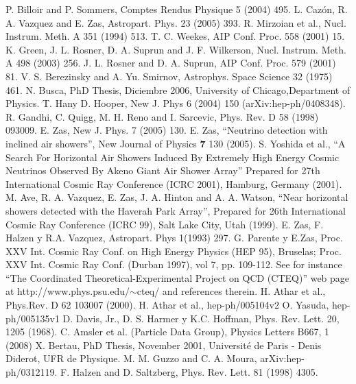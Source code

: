 \begin{thebibliography}{1}
 P. Billoir and P. Sommers, Comptes Rendus Physique 5 (2004) 495.
 L. Cazón, R. A. Vazquez and E. Zas, Astropart. Phys. 23 (2005) 393.
 R. Mirzoian et al., Nucl. Instrum. Meth. A 351 (1994) 513.
 T. C. Weekes, AIP Conf. Proc. 558 (2001) 15.
 K. Green, J. L. Rosner, D. A. Suprun and J. F. Wilkerson, Nucl. Instrum. Meth. A 498 (2003) 256.
 J. L. Rosner and D. A. Suprun, AIP Conf. Proc. 579 (2001) 81.
 V. S. Berezinsky and A. Yu. Smirnov, Astrophys. Space Science 32 (1975) 461.
 N. Busca, PhD Thesis, Diciembre 2006, University of Chicago,Department of Physics.
 T. Hany D. Hooper, New J. Phys 6 (2004) 150 (arXiv:hep-ph/0408348).
 R. Gandhi, C. Quigg, M. H. Reno and I. Sarcevic, Phys. Rev. D 58 (1998) 093009.
 E. Zas, New J. Phys. 7 (2005) 130.
 E. Zas, ``Neutrino detection with inclined air showers'', New Journal of Physics {\bf 7} 130 (2005).
 S. Yoshida et al., ``A Search For Horizontal Air Showers Induced By Extremely High Energy Cosmic Neutrinos Observed By Akeno Giant Air Shower Array'' Prepared for 27th International Cosmic Ray Conference (ICRC 2001), Hamburg, Germany (2001).
 M. Ave, R. A. Vazquez, E. Zas, J. A. Hinton and A. A. Watson, ``Near horizontal showers detected with the Haverah Park Array'', Prepared for 26th International Cosmic Ray Conference (ICRC 99), Salt Lake City, Utah (1999).    
 E. Zas, F. Halzen y R.A. Vazquez, Astropart. Phys 1(1993) 297.
 G. Parente y E.Zas, Proc. XXV Int. Cosmic Ray Conf. on High Energy Physics (HEP 95), Bruselas; Proc. XXV Int. Cosmic Ray Conf. (Durban 1997), vol 7, pp. 109-112.
 See for instance ``The Coordinated Theoretical-Experimental Project on QCD (CTEQ)'' web page at http://www.phys.psu.edu/$\sim$cteq/ and references therein. 
 H. Athar et al., Phys.Rev. D 62 103007 (2000). H. Athar et al., hep-ph/005104v2 O. Yasuda, hep-ph/005135v1
 D. Davis, Jr., D. S. Harmer y K.C. Hoffman, Phys. Rev. Lett. 20, 1205 (1968).
 C. Amsler et al. (Particle Data Group), Physics Letters B667, 1 (2008)
 X. Bertau, PhD Thesis, November 2001, Université de Paris - Denis Diderot, UFR de Physique.
 M. M. Guzzo and C. A. Moura, arXiv:hep-ph/0312119.
 F. Halzen and D. Saltzberg, Phys. Rev. Lett. 81 (1998) 4305.

\end{thebibliography}
